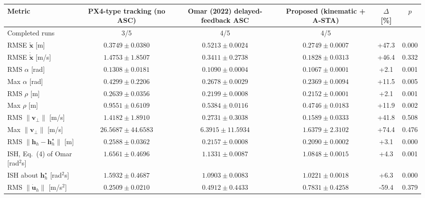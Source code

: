 \begin{tabular}{lccccc}
\toprule
Metric & PX4-type tracking (no ASC) & Omar (2022) delayed-feedback ASC & Proposed (kinematic + A-STA) & $\Delta$ [\%] & $p$ \\
\midrule
Completed runs & 3/5 & 4/5 & 4/5 & & \\
RMSE $\tilde{\mathbf{x}}$ [m] & $0.3749 \pm 0.0380$ & $0.5213 \pm 0.0024$ & $0.2749 \pm 0.0007$ & +47.3 & 0.000 \\
RMSE $\dot{\tilde{\mathbf{x}}}$ [m/s] & $1.4753 \pm 1.8507$ & $0.3411 \pm 0.2738$ & $0.1828 \pm 0.0313$ & +46.4 & 0.332 \\
RMS $\alpha$ [rad] & $0.1308 \pm 0.0181$ & $0.1090 \pm 0.0004$ & $0.1067 \pm 0.0001$ & +2.1 & 0.001 \\
Max $\alpha$ [rad] & $0.4299 \pm 0.2206$ & $0.2678 \pm 0.0029$ & $0.2369 \pm 0.0094$ & +11.5 & 0.005 \\
RMS $\rho$ [m] & $0.2639 \pm 0.0356$ & $0.2199 \pm 0.0008$ & $0.2152 \pm 0.0001$ & +2.1 & 0.001 \\
Max $\rho$ [m] & $0.9551 \pm 0.6109$ & $0.5384 \pm 0.0116$ & $0.4746 \pm 0.0183$ & +11.9 & 0.002 \\
RMS $\|\mathbf{v}_\perp\|$ [m/s] & $1.4182 \pm 1.8910$ & $0.2731 \pm 0.3038$ & $0.1589 \pm 0.0333$ & +41.8 & 0.508 \\
Max $\|\mathbf{v}_\perp\|$ [m/s] & $26.5687 \pm 44.6583$ & $6.3915 \pm 11.5934$ & $1.6379 \pm 2.3102$ & +74.4 & 0.476 \\
RMS $\|\mathbf{h}_h-\mathbf{h}^\star_h\|$ [m] & $0.2588 \pm 0.0362$ & $0.2157 \pm 0.0008$ & $0.2090 \pm 0.0002$ & +3.1 & 0.000 \\
ISH, Eq.~(4) of Omar [rad$^2$s] & $1.6561 \pm 0.4696$ & $1.1331 \pm 0.0087$ & $1.0848 \pm 0.0015$ & +4.3 & 0.001 \\
ISH about $\mathbf{h}^\star_h$ [rad$^2$s] & $1.5932 \pm 0.4687$ & $1.0903 \pm 0.0083$ & $1.0221 \pm 0.0018$ & +6.3 & 0.000 \\
RMS $\|\dot{\mathbf{u}}_h\|$ [m/s$^2$] & $0.2509 \pm 0.0210$ & $0.4912 \pm 0.4433$ & $0.7831 \pm 0.4258$ & -59.4 & 0.379 \\
\bottomrule
\end{tabular}
